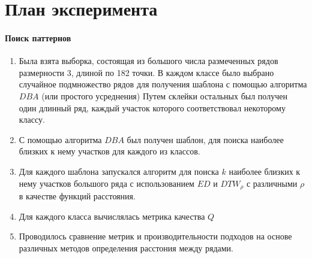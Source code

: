 \documentclass[12pt,twoside]{article}
\begin{document}
				
    \section{План эксперимента}
        \paragraph{Поиск паттернов}
        \begin{enumerate}
            \item Была взята выборка, состоящая из большого числа размеченных рядов размерности $3$, длиной по 182 точки.
                В каждом классе было выбрано случайное подмножество рядов для получения шаблона с помощью алгоритма $DBA$ (или простого усреднения)
                Путем склейки остальных был получен один длинный ряд, каждый участок которого соответствовал некоторому классу.
            \item С помощью алгоритма $DBA$ был получен шаблон, для поиска наиболее близких к нему участков для каждого из классов.
            \item Для каждого шаблона запускался алгоритм для поиска $k$ наиболее близких к нему участков большого ряда с использованием $ED$ и $DTW_\rho$
                с различными $\rho$ в качестве функций расстояния.
            \item Для каждого класса вычислялась метрика качества $Q$
            \item Проводилось сравнение метрик и производительности подходов на основе различных методов определения расстония между рядами.

        \end{enumerate}
        
\end{document}
